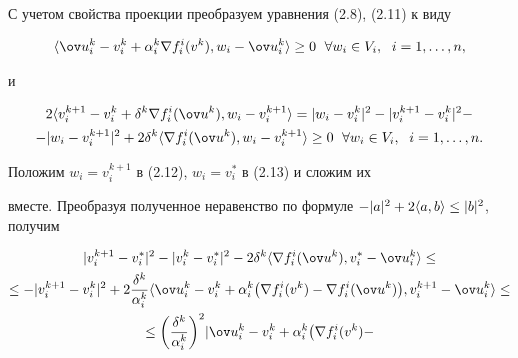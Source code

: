  


\begin{pf} 


С учетом свойства проекции преобразуем уравнения (2.8), (2.11) к виду 


\begin{equation} 


\la\ov u{}^k_i-v^k_i+\alpha^k_i\nabla f^i_i(v^k), 


w_i-\ov u{}^k_i\ra\ge0\ \; \forall w_i\in V_i, 


\ \; i=1,\dotsc,n, 


\end{equation} 


и 


\begin{multline} 


2\la v^{k+1}_i-v^k_i+\delta^k\nabla f^i_i(\ov u{}^k), 


w_i-v^{k+1}_i\ra=|w_i-v^k_i|^2-|v^{k+1}_i-v^k_i|^2- \\ 


% 


-|w_i-v^{k+1}_i|^2+2\delta^k\la\nabla f^i_i(\ov u{}^k), 


w_i-v^{k+1}_i\ra\ge0\ \; \forall w_i\in V_i, 


\ \; i=1,\dotsc,n. 


\end{multline} 


Положим $w_i=v^{k+1}_i$ в (2.12), $w_i=v^*_i$ в (2.13) и сложим их 


вместе. Преобразуя полученное неравенство по формуле $-|a|^2+2\la 


a,b\ra\le|b|^2$, получим 


\begin{multline*} 


|v^{k+1}_i-v^*_i|^2-|v^k_i-v^*_i|^2- 


2\delta^k\la\nabla f^i_i(\ov u{}^k),v^*_i-\ov u{}^k_i\ra\le \\ 


% 


\le -|v^{k+1}_i-v^k_i|^2+2\frac{\delta^k}{\alpha^k_i} 


\la\ov u{}^k_i-v^k_i+\alpha^k_i\big(\nabla f^i_i(v^k)- 


\nabla f^i_i(\ov u{}^k)\big),v^{k+1}_i-\ov u{}^k_i\ra\le \\ 


% 


\le \bigg(\frac{\delta^k}{\alpha^k_i} \bigg)^2


|\ov u{}^k_i-v^k_i+\alpha^k_i\big(\nabla f^i_i(v^k)- 



\end{multline*}
\end{pf}
